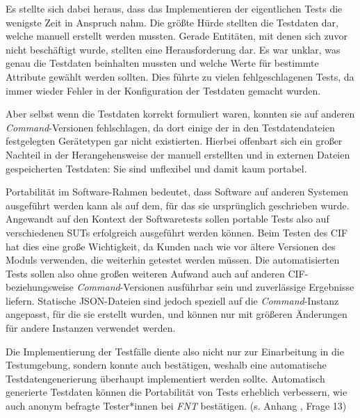 Es stellte sich dabei heraus, dass das Implementieren der eigentlichen Tests die wenigste Zeit in Anspruch nahm. Die größte Hürde stellten die Testdaten dar, welche manuell erstellt werden mussten. Gerade Entitäten, mit denen sich zuvor nicht beschäftigt wurde, stellten eine Herausforderung dar. Es war unklar, was genau die Testdaten beinhalten mussten und welche Werte für bestimmte Attribute gewählt werden sollten. Dies führte zu vielen fehlgeschlagenen Tests, da immer wieder Fehler in der Konfiguration der Testdaten gemacht wurden.

Aber selbst wenn die Testdaten korrekt formuliert waren, konnten sie auf anderen \textit{Command}-Versionen fehlschlagen, da dort einige der in den Testdatendateien festgelegten Gerätetypen gar nicht existierten. Hierbei offenbart sich ein großer Nachteil in der Herangehensweise der manuell erstellten und in externen Dateien gespeicherten Testdaten: Sie sind unflexibel und damit kaum portabel. 

Portabilität im Software-Rahmen bedeutet, dass Software auf anderen Systemen ausgeführt werden kann als auf dem, für das sie ursprünglich geschrieben wurde. \cite{brown:2003} Angewandt auf den Kontext der Softwaretests sollen portable Tests also auf verschiedenen \ac{SUT}s erfolgreich ausgeführt werden können. Beim Testen des \ac{CIF} hat dies eine große Wichtigkeit, da Kunden nach wie vor ältere Versionen des Moduls verwenden, die weiterhin getestet werden müssen. Die automatisierten Tests sollen also ohne großen weiteren Aufwand auch auf anderen \ac{CIF}- beziehungsweise \textit{Command}-Versionen ausführbar sein und zuverlässige Ergebnisse liefern. Statische \ac{JSON}-Dateien sind jedoch speziell auf die \textit{Command}-Instanz angepasst, für die sie erstellt wurden, und können nur mit größeren Änderungen für andere Instanzen verwendet werden. 

Die Implementierung der Testfälle diente also nicht nur zur Einarbeitung in die Testumgebung, sondern konnte auch bestätigen, weshalb eine automatische Testdatengenerierung überhaupt implementiert werden sollte. Automatisch generierte Testdaten können die Portabilität von Tests erheblich verbessern, wie auch anonym befragte Tester*innen bei \textit{FNT} bestätigen. (s. Anhang , Frage 13)